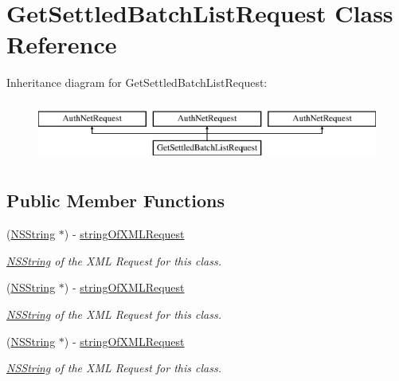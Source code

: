 \hypertarget{interface_get_settled_batch_list_request}{
\section{GetSettledBatchListRequest Class Reference}
\label{interface_get_settled_batch_list_request}
}
Inheritance diagram for GetSettledBatchListRequest:\begin{figure}[H]
\begin{center}
\leavevmode
\includegraphics[height=2.000000cm]{interface_get_settled_batch_list_request}
\end{center}
\end{figure}
\subsection*{Public Member Functions}
\begin{DoxyCompactItemize}
\item 
(\hyperlink{class_n_s_string}{NSString} $\ast$) -\/ \hyperlink{interface_get_settled_batch_list_request_a712612028b479ee9d5c360b221c582d1}{stringOfXMLRequest}
\begin{DoxyCompactList}\small\item\em \hyperlink{class_n_s_string}{NSString} of the XML Request for this class. \item\end{DoxyCompactList}\item 
(\hyperlink{class_n_s_string}{NSString} $\ast$) -\/ \hyperlink{interface_get_settled_batch_list_request_a712612028b479ee9d5c360b221c582d1}{stringOfXMLRequest}
\begin{DoxyCompactList}\small\item\em \hyperlink{class_n_s_string}{NSString} of the XML Request for this class. \item\end{DoxyCompactList}\item 
(\hyperlink{class_n_s_string}{NSString} $\ast$) -\/ \hyperlink{interface_get_settled_batch_list_request_a712612028b479ee9d5c360b221c582d1}{stringOfXMLRequest}
\begin{DoxyCompactList}\small\item\em \hyperlink{class_n_s_string}{NSString} of the XML Request for this class. \item\end{DoxyCompactList}\end{DoxyCompactItemize}
